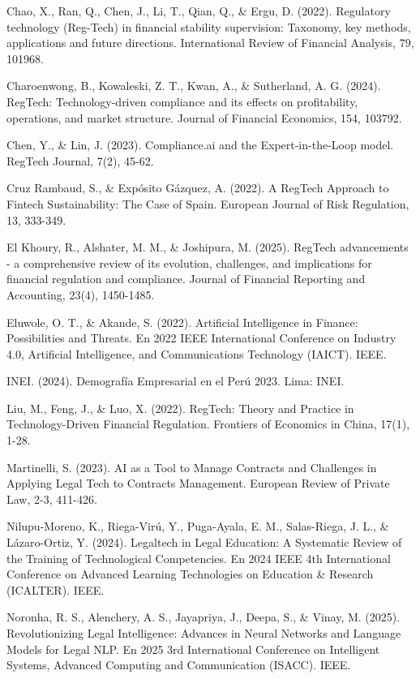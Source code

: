 \documentclass[12pt,a4paper,oneside]{report}
\begin{document}
Chao, X., Ran, Q., Chen, J., Li, T., Qian, Q., \& Ergu, D. (2022). Regulatory technology (Reg-Tech) in financial stability supervision: Taxonomy, key methods, applications and future directions. International Review of Financial Analysis, 79, 101968.

Charoenwong, B., Kowaleski, Z. T., Kwan, A., \& Sutherland, A. G. (2024). RegTech: Technology-driven compliance and its effects on profitability, operations, and market structure. Journal of Financial Economics, 154, 103792.

Chen, Y., \& Lin, J. (2023). Compliance.ai and the Expert-in-the-Loop model. RegTech Journal, 7(2), 45-62.

Cruz Rambaud, S., \& Expósito Gázquez, A. (2022). A RegTech Approach to Fintech Sustainability: The Case of Spain. European Journal of Risk Regulation, 13, 333-349.

El Khoury, R., Alshater, M. M., \& Joshipura, M. (2025). RegTech advancements - a comprehensive review of its evolution, challenges, and implications for financial regulation and compliance. Journal of Financial Reporting and Accounting, 23(4), 1450-1485.

Eluwole, O. T., \& Akande, S. (2022). Artificial Intelligence in Finance: Possibilities and Threats. En 2022 IEEE International Conference on Industry 4.0, Artificial Intelligence, and Communications Technology (IAICT). IEEE.

INEI. (2024). Demografía Empresarial en el Perú 2023. Lima: INEI.

Liu, M., Feng, J., \& Luo, X. (2022). RegTech: Theory and Practice in Technology-Driven Financial Regulation. Frontiers of Economics in China, 17(1), 1-28.

Martinelli, S. (2023). AI as a Tool to Manage Contracts and Challenges in Applying Legal Tech to Contracts Management. European Review of Private Law, 2-3, 411-426.

Nilupu-Moreno, K., Riega-Virú, Y., Puga-Ayala, E. M., Salas-Riega, J. L., \& Lázaro-Ortiz, Y. (2024). Legaltech in Legal Education: A Systematic Review of the Training of Technological Competencies. En 2024 IEEE 4th International Conference on Advanced Learning Technologies on Education \& Research (ICALTER). IEEE.

Noronha, R. S., Alenchery, A. S., Jayapriya, J., Deepa, S., \& Vinay, M. (2025). Revolutionizing Legal Intelligence: Advances in Neural Networks and Language Models for Legal NLP. En 2025 3rd International Conference on Intelligent Systems, Advanced Computing and Communication (ISACC). IEEE.
\end{document}
